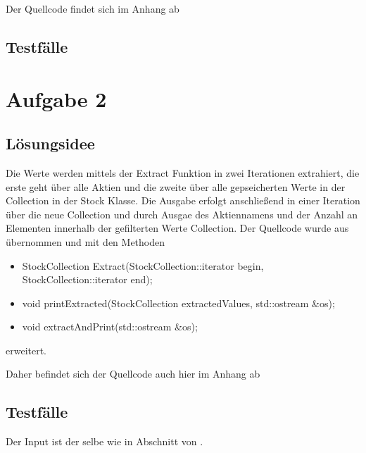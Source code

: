 \documentclass[a4paper,oneside,openany]{tufte-book}
\begin{document}
Der Quellcode findet sich im Anhang ab 

\section{Testf\"{a}lle}\label{sec:TestA1}


\newpage
\begin{fullwidth}

\end{fullwidth}

\chapter{Aufgabe 2}

\section{L\"{o}sungsidee}

Die Werte werden mittels der Extract Funktion in zwei Iterationen extrahiert, die erste geht über alle Aktien und die zweite über alle gepseicherten Werte in der Collection in der Stock Klasse.
Die  Ausgabe erfolgt anschließend in einer Iteration über die neue Collection und durch Ausgae des Aktiennamens und der Anzahl an Elementen innerhalb der gefilterten Werte Collection.
Der Quellcode wurde aus  übernommen und mit den Methoden 
  \begin{itemize}
    \item StockCollection Extract(StockCollection::iterator begin, StockCollection::iterator end);
    \item void printExtracted(StockCollection extractedValues, std::ostream \&os);
    \item void extractAndPrint(std::ostream \&os);
  \end{itemize}
erweitert. 

Daher befindet sich der Quellcode auch hier im Anhang ab 

\section{Testf\"{a}lle}

Der Input ist der selbe wie in Abschnitt  von .


\end{document}
